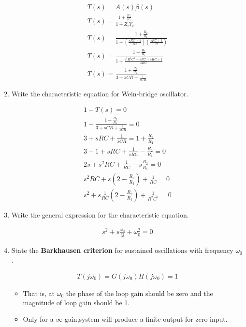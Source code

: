 \begin{enumerate}[label=\arabic*.,ref=\theenumi]
\solution
\begin{align}
    T(s) = A(s) \beta(s) \\ 
    T(s) = \frac{1+\frac{R_2}{R_1}}{1 + Z_s Y_p} \\
    T(s) = \frac{1+\frac{R_2}{R_1}}{1 + (\frac{sRC + 1}{sC}) (\frac{sRC+1}{R})} \\
    T(s) = \frac{1+\frac{R_2}{R_1}}{1 + \frac{s^2R^2C^2 +sRC + sRC + 1}{sRC}} \\
    T(s) = \frac{1 + \frac{R_2}{R_1}}{3 + sCR + \frac{1}{sCR}} \label{eq:ee18btech11044_3_1}
\end{align}

\item Write the characteristic equation for Wein-bridge oscillator.

\solution
\begin{align}
    1 - T(s) = 0  \\
    1 - \frac{1 + \frac{R_2}{R_1}}{3 + sCR + \frac{1}{sCR}} = 0  \\
    3 + sRC + \frac{1}{sCR} = 1 + \frac{R_2}{R_1}  \\
    3 - 1 +sRC +\frac{1}{sRC} -\frac{R_2}{R_1} = 0  \\
    2s + s^2 RC + \frac{1}{RC} -s\frac{R_2}{R_1} = 0  \\
    s^2 RC + s(2 - \frac{R_2}{R_1}) + \frac{1}{RC} =0 \\
    s^2 + s \frac{1}{RC}(2-\frac{R_2}{R_1}) + \frac{1}{R^2C^2} = 0 \label{eq:ee18btech11044_3_2}
\end{align}

\item
Write the general expression for the characteristic equation.

\solution
\begin{align}
    s^2 + s\frac{\omega_0}{Q} + \omega_0^2 = 0 \label{eq:ee18btech11044_3_3}
\end{align}

\item State the \textbf{Barkhausen criterion} for sustained oscillations with frequency $\omega_0$.

\solution
\begin{align}
    T(j\omega_0) = G(j\omega_0)  H(j\omega_0) = 1
\end{align}
\begin{itemize}
    \item That is, at $\omega_0$ the phase of the loop gain should be zero and the magnitude of loop gain should be 1.
    \item Only for a $\infty$ gain,system will produce a finite output for zero input. 
\end{itemize}


\end{enumerate}
